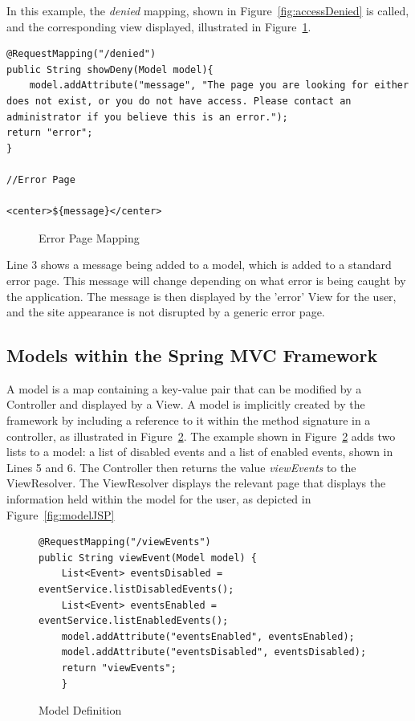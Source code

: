 In this example, the \textit{denied} mapping, shown in Figure~\ref{fig:accessDenied} is called, and the corresponding view displayed, illustrated in Figure~\ref{fig:viewDenied}. 

\begin{lstlisting}
@RequestMapping("/denied")
public String showDeny(Model model){
	model.addAttribute("message", "The page you are looking for either does not exist, or you do not have access. Please contact an administrator if you believe this is an error.");
return "error";
}

//Error Page

<center>${message}</center>
\end{lstlisting}
\begin{figure}[H]
\caption{Error Page Mapping}
\label{fig:viewDenied}
\end{figure}

Line 3 shows a message being added to a model, which is added to a standard error page. This message will change depending on what error is being caught by the application. The message is then displayed by the 'error' View for the user, and the site appearance is not disrupted by a generic error page.

\subsection{Models within the Spring MVC Framework}

A model is a map containing a key-value pair that can be modified by a Controller and displayed by a View. A model is implicitly created by the framework by including a reference to it within the method signature in a controller, as illustrated in Figure~\ref{fig:modelDefine}. The example shown in Figure~\ref{fig:modelDefine} adds two lists to a model: a list of disabled events and a list of enabled events, shown in Lines 5 and 6. The Controller then returns the value \textit{viewEvents} to the ViewResolver. The ViewResolver displays the relevant page that displays the information held within the model for the user, as depicted in Figure~\ref{fig:modelJSP}

\begin{figure}[H]
\begin{lstlisting}
@RequestMapping("/viewEvents")
public String viewEvent(Model model) {
	List<Event> eventsDisabled = eventService.listDisabledEvents();
	List<Event> eventsEnabled = eventService.listEnabledEvents();
	model.addAttribute("eventsEnabled", eventsEnabled);
	model.addAttribute("eventsDisabled", eventsDisabled);
    return "viewEvents";
	}
\end{lstlisting}
\caption{Model Definition}
\label{fig:modelDefine}
\end{figure}

